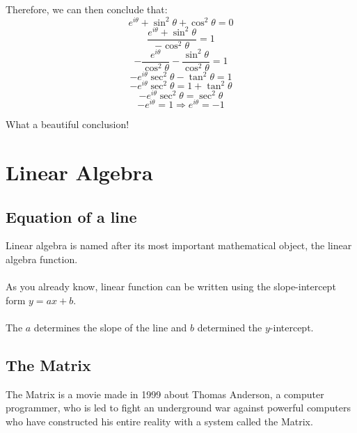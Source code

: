 \documentclass[a4paper]{article}
\theoremstyle{definition}
\newcommand{\sectionSpace}{\vspace{2em}} %
\newcommand{\subsectionSpace}{\vspace{0.5em}}
\begin{document}
    Therefore, we can then conclude that:
    $$e^{i\theta} + \sin^2\theta + \cos^2\theta = 0$$
    $$\frac{e^{i\theta} + \sin^2\theta}{-\cos^2\theta} = 1$$
    $$-\frac{e^{i\theta}}{\cos^2\theta} -\frac{\sin^2\theta}{\cos^2\theta} = 1$$
    $$-e^{i\theta}\sec^2\theta -\tan^2\theta = 1$$
    $$-e^{i\theta}\sec^2\theta = 1 + \tan^2\theta$$
    $$-e^{i\theta}\sec^2\theta = \sec^2\theta$$
    $$-e^{i\theta} = 1 \Rightarrow e^{i\theta} = -1$$

    What a beautiful conclusion!

\sectionSpace
\section{Linear Algebra}
    \subsection{Equation of a line}
    Linear algebra is named after its most important mathematical object, the linear algebra function.\\\\
    As you already know, linear function can be written using the slope-intercept form $y=ax+b$.\\\\
    The $a$ determines the slope of the line and $b$ determined the $y$-intercept.
    
\subsectionSpace
\subsection{The Matrix}
The Matrix is a movie made in 1999 about Thomas Anderson, a computer programmer, who is led to fight an underground war against powerful computers who have constructed his entire reality with a system called the Matrix.
\end{document}
